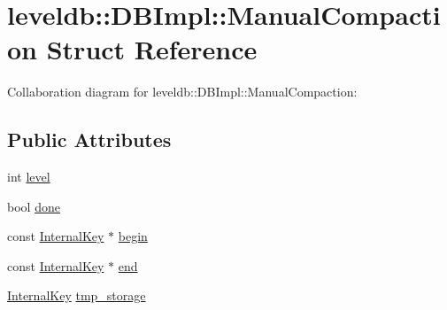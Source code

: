 \hypertarget{structleveldb_1_1_d_b_impl_1_1_manual_compaction}{\section{leveldb\-:\-:D\-B\-Impl\-:\-:Manual\-Compaction Struct Reference}
\label{structleveldb_1_1_d_b_impl_1_1_manual_compaction}
}


Collaboration diagram for leveldb\-:\-:D\-B\-Impl\-:\-:Manual\-Compaction\-:
\subsection*{Public Attributes}
\begin{DoxyCompactItemize}
\item 
int \hyperlink{structleveldb_1_1_d_b_impl_1_1_manual_compaction_a0dd5f180af0b1019f04532bfdb317141}{level}
\item 
bool \hyperlink{structleveldb_1_1_d_b_impl_1_1_manual_compaction_ae71836e3b7d69f5cc644199639d0cf1f}{done}
\item 
const \hyperlink{classleveldb_1_1_internal_key}{Internal\-Key} $\ast$ \hyperlink{structleveldb_1_1_d_b_impl_1_1_manual_compaction_ad3c64b2e5be6cdf8b34bc49ab1ec9ab3}{begin}
\item 
const \hyperlink{classleveldb_1_1_internal_key}{Internal\-Key} $\ast$ \hyperlink{structleveldb_1_1_d_b_impl_1_1_manual_compaction_a18771027d956c53188266bd860ab384b}{end}
\item 
\hyperlink{classleveldb_1_1_internal_key}{Internal\-Key} \hyperlink{structleveldb_1_1_d_b_impl_1_1_manual_compaction_acfd5de0d18f7df7d222f1c09e500c9bc}{tmp\-\_\-storage}
\end{DoxyCompactItemize}


